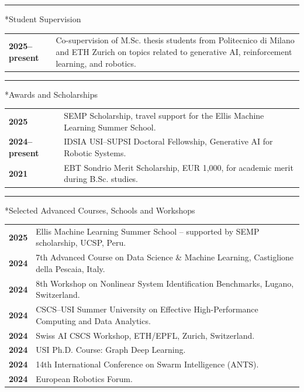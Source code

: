 \documentclass[10pt,a4paper]{article}
\makeatletter
\renewcommand{\section}{\@ifstar\cvsection\cvsection}
\newcommand{\cvsection}[1]{\par\addvspace{9pt}{\large\bfseries #1\par}\nobreak\vspace{4pt}\hrule\nobreak\vspace{5pt}}
\makeatother
\begin{document}
\section*{Student Supervision}
\begin{tabularx}{\textwidth}{@{}p{}@{\hspace{8pt}}X@{}}
\textbf{2025–present} & Co-supervision of M.Sc. thesis students from Politecnico di Milano and ETH Zurich on topics related to generative AI, reinforcement learning, and robotics.
\end{tabularx}

\section*{Awards and Scholarships}
\begin{tabularx}{\textwidth}{@{}p{}@{\hspace{8pt}}X@{}}
\textbf{2025} & SEMP Scholarship, travel support for the Ellis Machine Learning Summer School.\\[2pt]
\textbf{2024–present} & IDSIA USI–SUPSI Doctoral Fellowship, Generative AI for Robotic Systems.\\[2pt]
\textbf{2021} & EBT Sondrio Merit Scholarship, EUR 1,000, for academic merit during B.Sc. studies.
\end{tabularx}

\section*{Selected Advanced Courses, Schools and Workshops}
\begin{tabularx}{\textwidth}{@{}p{}@{\hspace{8pt}}X@{}}
\textbf{2025} & Ellis Machine Learning Summer School – supported by SEMP scholarship, UCSP, Peru.\\[2pt]
\textbf{2024} & 7th Advanced Course on Data Science \& Machine Learning, Castiglione della Pescaia, Italy.\\[2pt]
\textbf{2024} & 8th Workshop on Nonlinear System Identification Benchmarks, Lugano, Switzerland.\\[2pt]
\textbf{2024} & CSCS–USI Summer University on Effective High-Performance Computing and Data Analytics.\\[2pt]
\textbf{2024} & Swiss AI CSCS Workshop, ETH/EPFL, Zurich, Switzerland.\\[2pt]
\textbf{2024} & USI Ph.D. Course: Graph Deep Learning.\\[2pt]
\textbf{2024} & 14th International Conference on Swarm Intelligence (ANTS).\\[2pt]
\textbf{2024} & European Robotics Forum.
\end{tabularx}
\end{document}
